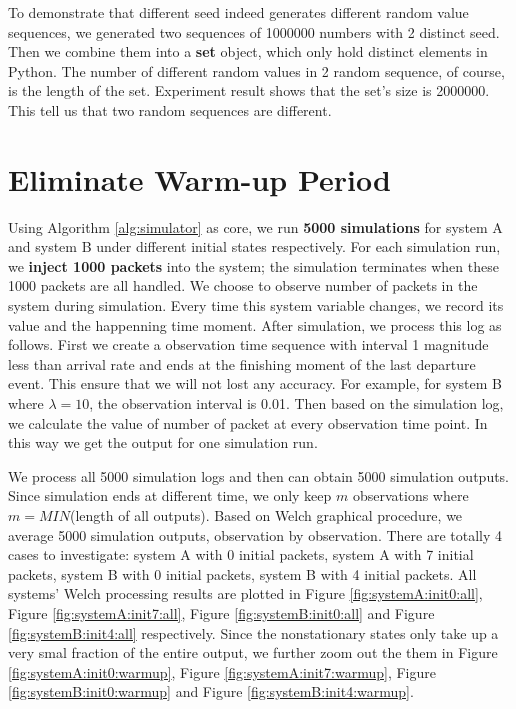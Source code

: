 \documentclass[12pt]{article}  %
\theoremstyle{definition}
\theoremstyle{remark}
\begin{document}
To demonstrate that different seed indeed generates different random value sequences, we generated two sequences of 1000000 numbers with 2 distinct seed.
Then we combine them into a \textbf{set} object, which only hold distinct elements in Python.
The number of different random values in 2 random sequence, of course, is the length of the set.
Experiment result shows that the set's size is 2000000.
This tell us that two random sequences are different.


\section{Eliminate Warm-up Period}
Using Algorithm \ref{alg:simulator} as core, we run \textbf{5000 simulations} for system A and system B under different initial states respectively.
For each simulation run, we \textbf{inject 1000 packets} into the system; the simulation terminates when these 1000 packets are all handled.
We choose to observe number of packets in the system during simulation.
Every time this system variable changes, we record its value and the happenning time moment.
After simulation, we process this log as follows.
First we create a observation time sequence with interval 1 magnitude less than arrival rate and ends at the finishing moment of the last departure event.
This ensure that we will not lost any accuracy.
For example, for system B where $\lambda=10$, the observation interval is 0.01.
Then based on the simulation log, we calculate the value of number of packet at every observation time point.
In this way we get the output for one simulation run.

We process all 5000 simulation logs and then can obtain 5000 simulation outputs.
Since simulation ends at different time, we only keep $m$ observations where $m = MIN$(length of all outputs).
Based on Welch graphical procedure, we average 5000 simulation outputs, observation by observation.
There are totally 4 cases to investigate: system A with 0 initial packets, system A with 7 initial packets, system B with 0 initial packets, system B with 4 initial packets.
All systems' Welch processing results are plotted in Figure \ref{fig:systemA:init0:all}, Figure \ref{fig:systemA:init7:all}, Figure \ref{fig:systemB:init0:all} and Figure \ref{fig:systemB:init4:all} respectively.
Since the nonstationary states only take up a very smal fraction of the entire output, we further zoom out the them in Figure \ref{fig:systemA:init0:warmup}, Figure \ref{fig:systemA:init7:warmup}, Figure \ref{fig:systemB:init0:warmup} and Figure \ref{fig:systemB:init4:warmup}.
\end{document}
